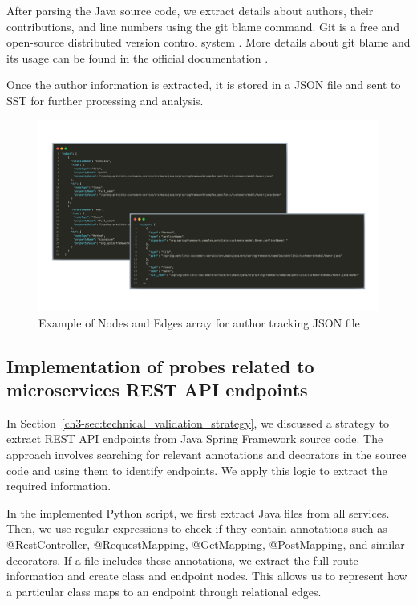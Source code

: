 After parsing the Java source code, we extract details about authors, their contributions, and line numbers using the git blame command. Git is a free and open-source distributed version control system \citep{git}. More details about git blame and its usage can be found in the official documentation \citep{git-blame}.

Once the author information is extracted, it is stored in a JSON file and sent to SST for further processing and analysis.

\begin{figure}[H]
    \centering
    \includegraphics[width=1\textwidth]{figures/nodes_edges_example1.png}
    \caption{Example of Nodes and Edges array for author tracking JSON file}
    \label{fig:example_nodes_edges_author_tracking}
\end{figure}

\subsection{Implementation of probes related to microservices REST API endpoints}

In Section~\ref{ch3-sec:technical_validation_strategy}, we discussed a strategy to extract REST API endpoints from Java Spring Framework source code. The approach involves searching for relevant annotations and decorators in the source code and using them to identify endpoints. We apply this logic to extract the required information.  

In the implemented Python script, we first extract Java files from all services. Then, we use regular expressions to check if they contain annotations such as @RestController, @RequestMapping, @GetMapping, @PostMapping, and similar decorators. If a file includes these annotations, we extract the full route information and create class and endpoint nodes. This allows us to represent how a particular class maps to an endpoint through relational edges.

